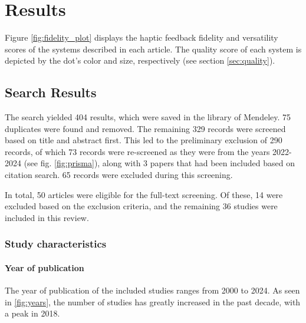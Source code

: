 \section{Results}
\label{sec:results}

Figure \ref{fig:fidelity_plot} displays the haptic feedback fidelity and versatility scores of the systems described in each article. The quality score of each system is depicted by the dot's color and size, respectively (see section \ref{sec:quality}).


\subsection{Search Results}


The search yielded 404 results, which were saved in the library of Mendeley. 75 duplicates were found and removed. The remaining 329 records were screened based on title and abstract first. This led to the preliminary exclusion of 290 records, of which 73 records were re-screened as they were from the years 2022-2024 (see fig. \ref{fig:prisma}), along with 3 papers that had been included based on citation search. 
65 records were excluded during this screening.

In total, 50 articles were eligible for the full-text screening. Of these, 14 were excluded based on the exclusion criteria, and the remaining 36 studies were included in this review.


\subsubsection{Study characteristics}
\paragraph{Year of publication}
The year of publication of the included studies ranges from 2000 to 2024. As seen in \ref{fig:years}, the number of studies has greatly increased in the past decade, with a peak in 2018.


